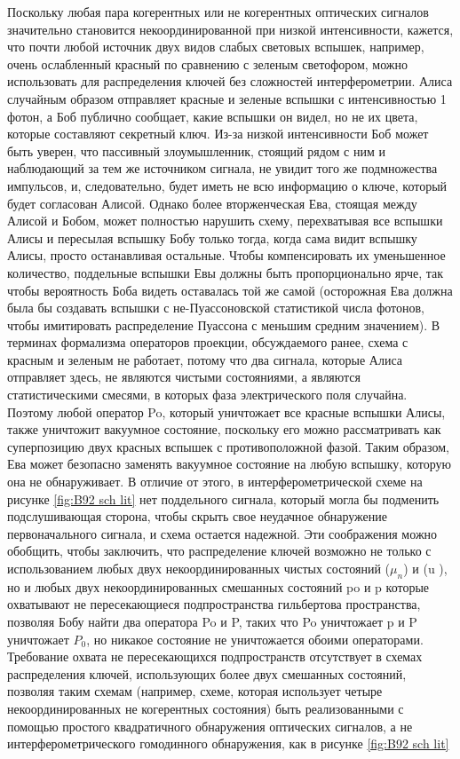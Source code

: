 Поскольку любая пара когерентных или не когерентных оптических сигналов значительно становится некоординированной при низкой интенсивности, кажется, что почти любой источник двух видов слабых световых вспышек, например, очень ослабленный красный по сравнению с зеленым светофором, можно использовать для распределения ключей без сложностей интерферометрии. Алиса случайным образом отправляет красные и зеленые вспышки с интенсивностью 1 фотон, а Боб публично сообщает, какие вспышки он видел, но не их цвета, которые составляют секретный ключ. Из-за низкой интенсивности Боб может быть уверен, что пассивный злоумышленник, стоящий рядом с ним и наблюдающий за тем же источником сигнала, не увидит того же подмножества импульсов, и, следовательно, будет иметь не всю информацию о ключе, который будет согласован  Алисой. 
Однако более вторженческая Ева, стоящая между Алисой и Бобом, может полностью нарушить схему, перехватывая все вспышки Алисы и пересылая вспышку Бобу только тогда, когда сама видит вспышку Алисы, просто останавливая остальные. Чтобы компенсировать их уменьшенное количество, поддельные вспышки Евы должны быть пропорционально ярче, так чтобы вероятность Боба видеть оставалась той же самой (осторожная Ева должна была бы создавать вспышки с не-Пуассоновской статистикой числа фотонов, чтобы имитировать распределение Пуассона с меньшим средним значением). В терминах формализма операторов проекции, обсуждаемого ранее, схема с красным и зеленым не работает, потому что два сигнала, которые Алиса отправляет здесь, не являются чистыми состояниями, а являются статистическими смесями, в которых фаза электрического поля случайна. Поэтому любой оператор Po, который уничтожает все красные вспышки Алисы, также уничтожит вакуумное состояние, поскольку его можно рассматривать как суперпозицию двух красных вспышек с противоположной фазой. Таким образом, Ева может безопасно заменять вакуумное состояние на любую вспышку, которую она не обнаруживает. В отличие от этого, в интерферометрической схеме на рисунке \ref{fig:B92 sch lit} нет поддельного сигнала, который могла бы подменить подслушивающая сторона, чтобы скрыть свое неудачное обнаружение первоначального сигнала, и схема остается надежной. Эти соображения можно обобщить, чтобы заключить, что распределение ключей возможно не только с использованием любых двух некоординированных чистых состояний ($\mu_n$) и (u ), но и любых двух некоординированных смешанных состояний po и p которые охватывают не пересекающиеся подпространства гильбертова пространства, позволяя Бобу найти два оператора Po и P, таких что Po уничтожает p и P уничтожает $P_0$, но никакое состояние не уничтожается обоими операторами. Требование охвата не пересекающихся подпространств отсутствует в схемах распределения ключей, использующих более двух смешанных состояний, позволяя таким схемам (например, схеме, которая использует четыре некоординированных не когерентных состояния) быть реализованными с помощью простого квадратичного обнаружения оптических сигналов, а не интерферометрического гомодинного обнаружения, как в рисунке \ref{fig:B92 sch lit}

